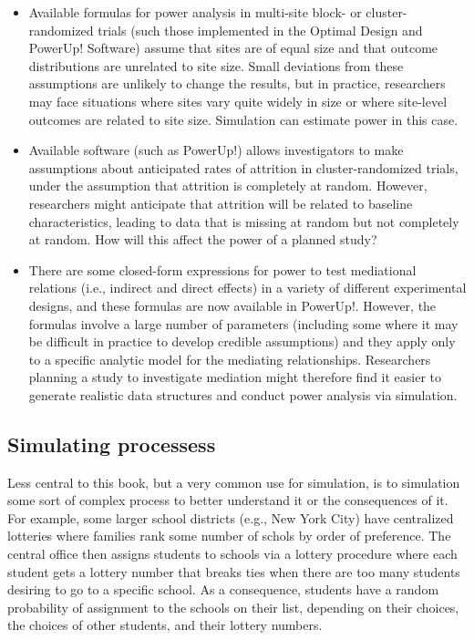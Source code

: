 \documentclass[
]{book}
\begin{document}
\begin{itemize}
\item
  Available formulas for power analysis in multi-site block- or cluster-randomized trials (such those implemented in the Optimal Design and PowerUp! Software) assume that sites are of equal size and that outcome distributions are unrelated to site size. Small deviations from these assumptions are unlikely to change the results, but in practice, researchers may face situations where sites vary quite widely in size or where site-level outcomes are related to site size. Simulation can estimate power in this case.
\item
  Available software (such as PowerUp!) allows investigators to make assumptions about anticipated rates of attrition in cluster-randomized trials, under the assumption that attrition is completely at random. However, researchers might anticipate that attrition will be related to baseline characteristics, leading to data that is missing at random but not completely at random. How will this affect the power of a planned study?
\item
  There are some closed-form expressions for power to test mediational relations (i.e., indirect and direct effects) in a variety of different experimental designs, and these formulas are now available in PowerUp!. However, the formulas involve a large number of parameters (including some where it may be difficult in practice to develop credible assumptions) and they apply only to a specific analytic model for the mediating relationships. Researchers planning a study to investigate mediation might therefore find it easier to generate realistic data structures and conduct power analysis via simulation.
\end{itemize}

\hypertarget{simulating-processess}{%
\subsection{Simulating processess}\label{simulating-processess}}

Less central to this book, but a very common use for simulation, is to simulation some sort of complex process to better understand it or the consequences of it.
For example, some larger school districts (e.g., New York City) have centralized lotteries where families rank some number of schols by order of preference.
The central office then assigns students to schools via a lottery procedure where each student gets a lottery number that breaks ties when there are too many students desiring to go to a specific school.
As a consequence, students have a random probability of assignment to the schools on their list, depending on their choices, the choices of other students, and their lottery numbers.
\end{document}
